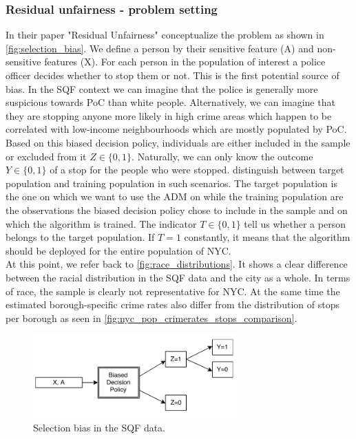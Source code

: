 \subsubsection*{Residual unfairness - problem setting}
In their paper "Residual Unfairness" \cite{kallus2018} conceptualize the problem as shown in \autoref{fig:selection_bias}.
We define a person by their sensitive feature (A) and non-sensitive features (X). For each person in the population of interest a police officer decides whether to stop them or not. This is the first potential source of bias. In the SQF context we can imagine that the police is generally more suspicious towards PoC than white people. Alternatively, we can imagine that they are stopping anyone more likely in high crime areas which happen to be correlated with low-income neighbourhoods which are mostly populated by PoC. \\
Based on this biased decision policy, individuals are either included in the sample or excluded from it $Z \in \{0,1\}$.  Naturally, we can only know the outcome $Y \in \{0, 1\}$ of a stop for the people who were stopped.
\cite{kallus2018} distinguish between target population and training population in such scenarios. The target population is the one on which we want to use the ADM on while the training population are the observations the biased decision policy chose to include in the sample and on which the algorithm is trained. The indicator $T \in \{0, 1\}$ tell us whether a person belongs to the target population. If $T = 1$ constantly, it means that the algorithm should be deployed for the entire population of NYC.\\
At this point, we refer back to \autoref{fig:race_distributions}. It shows a clear difference between the racial distribution in the SQF data and the city as a whole. In terms of race, the sample is clearly not representative for NYC. At the same time the estimated borough-specific crime rates also differ from the distribution of stops per borough as seen in \autoref{fig:nyc_pop_crimerates_stops_comparison}. \\

\begin{figure}
    \includegraphics[width=0.7\textwidth]{../figures/selection_bias.png}
    \caption{Selection bias in the SQF data.}
    \label{fig:selection_bias}
\end{figure}

